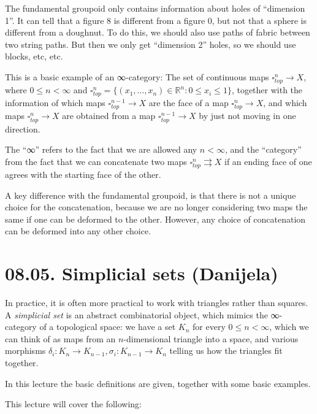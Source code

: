 \documentclass[a4paper]{amsart}
\numberwithin{figure}{section}
\theoremstyle{theorem}
\theoremstyle{definition}
\newcommand{\RR}{\mathbb{R}}
\begin{document}
The fundamental groupoid only contains information about holes of ``dimension 1''. It can tell that a figure 8 is different from a figure 0, but not that a sphere is different from a doughnut. To do this, we should also use paths of fabric between two string paths. But then we only get ``dimension 2'' holes, so we should use blocks, etc, etc. 

This is a basic example of an ∞-category: The set of continuous maps $\square^n_{top} \to X$, where $0 \leq n < \infty$ and $\square^n_{top} = \{ (x_1, \dots, x_n) \in \RR^n : 0 \leq x_i \leq 1 \}$, together with the information of which maps $\square^{n-1}_{top} {\to} X$ are the face of a map $\square^n_{top} {\to} X$, and which maps $\square^n_{top} {\to} X$ are obtained from a map $\square^{n-1}_{top} {\to} X$ by just not moving in one direction.

The ``∞'' refers to the fact that we are allowed any $n < \infty$, and the ``category'' from the fact that we can concatenate two maps $\square^n_{top} {\rightrightarrows} X$ if an ending face of one agrees with the starting face of the other.

A key difference with the fundamental groupoid, is that there is not a unique choice for the concatenation, because we are no longer considering two maps the same if one can be deformed to the other. However, any choice of concatenation can be deformed into any other choice. 



\section{08.05. Simplicial sets (Danijela)}

In practice, it is often more practical to work with triangles rather than squares. A \emph{simplicial set} is an abstract combinatorial object, which mimics the ∞-category of a topological space: we have a set $K_n$ for every $0 \leq n < \infty$, which we can think of as maps from an $n$-dimensional triangle into a space, and various morphisms $\delta_i: K_n \to K_{n-1}, \sigma_i: K_{n-1} \to K_n$ telling us how the triangles fit together.

In this lecture the basic definitions are given, together with some basic examples.

This lecture will cover the following: 
\end{document}
